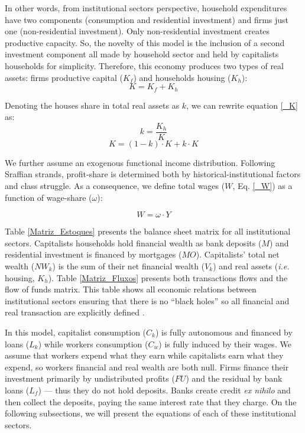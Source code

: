 \documentclass[11pt]{article}
\begin{document}
In other words, from institutional sectors perspective, household expenditures have two components (consumption and residential investment) and firms just one (non-residential investment). 
Only non-residential investment creates productive capacity. 
So, the novelty of this model is the inclusion of a second investment component all made by household sector and held by capitalists households for simplicity. 
Therefore, this economy produces two types of real assets: firms productive capital (\(K_f\)) and households housing (\(K_h\)):
\begin{equation}
    \label{_K}
    K = K_f + K_h
\end{equation}

Denoting the houses share in total real assets as \(k\), we can rewrite equation \ref{_K} as:
\begin{equation}
\label{_k}
    k = \frac{K_h}{K}
\end{equation}
$$
K = (1-k)\cdot K + k\cdot K
$$

We further assume an exogenous functional income distribution. 
Following Sraffian strands, profit-share is determined both by historical-institutional factors and class struggle.
As a consequence, we define total wages (\(W\), Eq. \ref{_W}) as a function of wage-share (\(\omega\)):

\begin{equation}
\label{_W}
    W = \omega\cdot Y
\end{equation}

Table \ref{Matriz_Estoques} presents the balance sheet matrix for all institutional sectors. 
Capitalists households hold financial wealth as bank deposits (\(M\)) and residential investment is financed by mortgages (\(MO\)).
Capitalists' total net wealth (\(NW_{k}\)) is the sum of their net financial wealth (\(V_{k}\)) and real assets (\textit{i.e.} housing, \(K_h\)). 
Table  \ref{Matriz_Fluxos} presents both transactions flows and the flow of funds matrix. 
This table shows all economic relations between institutional sectors ensuring that there is no  ``black holes''
so all financial and real transaction are explicitly defined \cite{macedo_e_silva_peering_2011}.

In this model, capitalist consumption (\(C_k\)) is fully autonomous and financed by loans (\(L_{k}\)) while workers consumption (\(C_w\)) is fully induced by their wages.
We assume that workers expend what they earn while capitalists earn what they expend, so workers financial and real wealth are both null.
Firms finance their investment primarily by undistributed profits (\(FU\)) and the residual by bank loans (\(L_f\)) --- thus they do not hold deposits. 
Banks create credit \textit{ex nihilo} and then collect the deposits, paying the same interest rate that they charge.
On the following subsections, we will present the equations of each of these institutional sectors.
\end{document}
